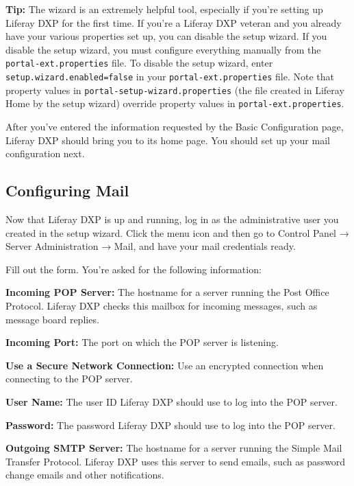 \noindent\hrulefill

\textbf{Tip:} The wizard is an extremely helpful tool, especially if
you're setting up Liferay DXP for the first time. If you're a Liferay DXP
veteran and you already have your various properties set up, you can
disable the setup wizard. If you disable the setup wizard, you must
configure everything manually from the \texttt{portal-ext.properties}
file. To disable the setup wizard, enter
\texttt{setup.wizard.enabled=false} in your
\texttt{portal-ext.properties} file. Note that property values in
\texttt{portal-setup-wizard.properties} (the file created in Liferay
Home by the setup wizard) override property values in
\texttt{portal-ext.properties}.

\noindent\hrulefill

After you've entered the information requested by the Basic
Configuration page, Liferay DXP should bring you to its home page. You
should set up your mail configuration next.

\subsection{Configuring Mail}\label{configuring-mail}

Now that Liferay DXP is up and running, log in as the administrative
user you created in the setup wizard. Click the menu icon and then go to
Control Panel → Server Administration → Mail, and have your mail
credentials ready.

Fill out the form. You're asked for the following information:

\textbf{Incoming POP Server:} The hostname for a server running the Post
Office Protocol. Liferay DXP checks this mailbox for incoming messages,
such as message board replies.

\textbf{Incoming Port:} The port on which the POP server is listening.

\textbf{Use a Secure Network Connection:} Use an encrypted connection
when connecting to the POP server.

\textbf{User Name:} The user ID Liferay DXP should use to log into the
POP server.

\textbf{Password:} The password Liferay DXP should use to log into the
POP server.

\textbf{Outgoing SMTP Server:} The hostname for a server running the
Simple Mail Transfer Protocol. Liferay DXP uses this server to send
emails, such as password change emails and other notifications.

